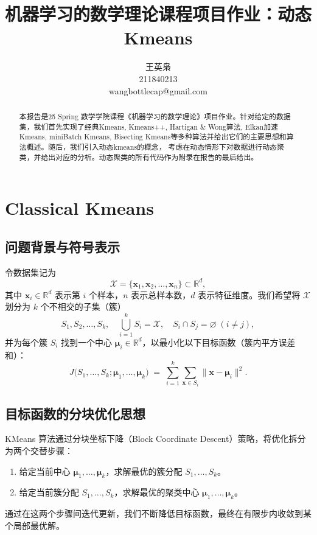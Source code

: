 \documentclass[12pt]{article}  %
\title{{机器学习的数学理论课程项目作业：动态Kmeans}}
\author{王英枭 \\
          211840213\\
         {\small wangbottlecap@gmail.com}}
\begin{document}
\maketitle

\begin{abstract}
本报告是25 Spring 数学学院课程《机器学习的数学理论》项目作业。针对给定的数据集，我们首先实现了经典Kmeans, Kmeans++, Hartigan \& Wong算法, Elkan加速Kmeans, miniBatch Kmeans, Bisecting Kmeans等多种算法并给出它们的主要思想和算法概述。随后，我们引入动态kmeans的概念，
考虑在动态情形下对数据进行动态聚类，并给出对应的分析。动态聚类的所有代码作为附录在报告的最后给出。
\end{abstract}
\newpage

\tableofcontents

\section{Classical Kmeans}
\subsection{问题背景与符号表示}
令数据集记为
\[
    \mathcal{X} = \{ \mathbf{x}_1, \mathbf{x}_2, \ldots, \mathbf{x}_n \} \subset \mathbb{R}^d,
\]
其中 \(\mathbf{x}_i \in \mathbb{R}^d\) 表示第 \(i\) 个样本，\(n\) 表示总样本数，\(d\) 表示特征维度。我们希望将 \(\mathcal{X}\) 划分为 \(k\) 个不相交的子集（簇）
\[
    S_1, S_2, \ldots, S_k, \quad \bigcup_{i=1}^k S_i = \mathcal{X}, \quad S_i \cap S_j = \varnothing \;(i \neq j),
\]
并为每个簇 \(S_i\) 找到一个中心 \(\boldsymbol{\mu}_i \in \mathbb{R}^d\)，以最小化以下目标函数（簇内平方误差和）：
\[
    J\big(S_1,\ldots,S_k; \boldsymbol{\mu}_1,\ldots,\boldsymbol{\mu}_k\big) 
    \;=\; \sum_{i=1}^k \sum_{\mathbf{x} \in S_i} \|\mathbf{x} - \boldsymbol{\mu}_i\|^2.
\]

\subsection{目标函数的分块优化思想}

KMeans 算法通过分块坐标下降（Block Coordinate Descent）策略，将优化拆分为两个交替步骤：
\begin{enumerate}
    \item 给定当前中心 \(\boldsymbol{\mu}_1,\ldots,\boldsymbol{\mu}_k\)，求解最优的簇分配 \(S_1,\ldots,S_k\)。
    \item 给定当前簇分配 \(S_1,\ldots,S_k\)，求解最优的聚类中心 \(\boldsymbol{\mu}_1,\ldots,\boldsymbol{\mu}_k\)。
\end{enumerate}
通过在这两个步骤间迭代更新，我们不断降低目标函数，最终在有限步内收敛到某个局部最优解。
\end{document}
